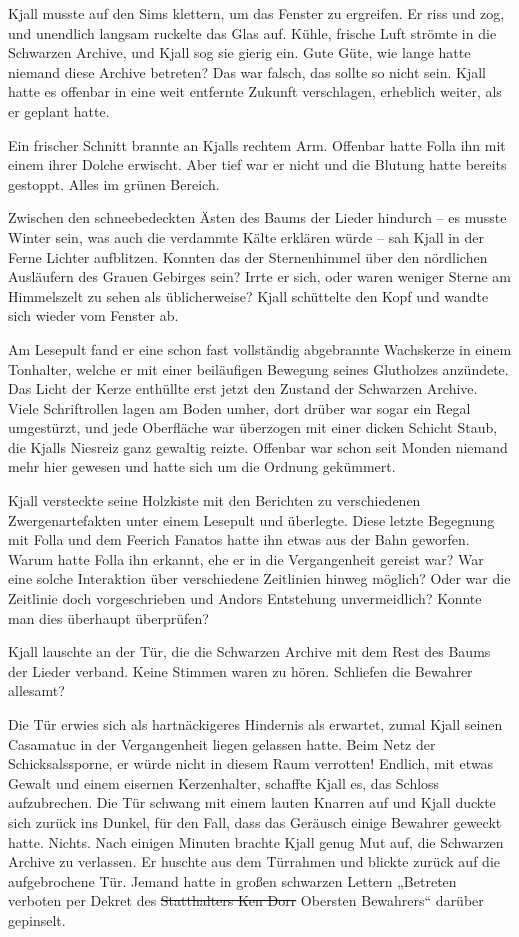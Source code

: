 Kjall musste auf den Sims klettern, um das Fenster zu ergreifen. Er riss und zog, und unendlich langsam ruckelte das Glas auf. Kühle, frische Luft strömte in die Schwarzen Archive, und Kjall sog sie gierig ein. Gute Güte, wie lange hatte niemand diese Archive betreten? Das war falsch, das sollte so nicht sein. Kjall hatte es offenbar in eine weit entfernte Zukunft verschlagen, erheblich weiter, als er geplant hatte.

Ein frischer Schnitt brannte an Kjalls rechtem Arm. Offenbar hatte Folla ihn mit einem ihrer Dolche erwischt. Aber tief war er nicht und die Blutung hatte bereits gestoppt. Alles im grünen Bereich.

Zwischen den schneebedeckten Ästen des Baums der Lieder hindurch – es musste Winter sein, was auch die verdammte Kälte erklären würde – sah Kjall in der Ferne Lichter aufblitzen. Konnten das der Sternenhimmel über den nördlichen Ausläufern des Grauen Gebirges sein? Irrte er sich, oder waren weniger Sterne am Himmelszelt zu sehen als üblicherweise? Kjall schüttelte den Kopf und wandte sich wieder vom Fenster ab.

Am Lesepult fand er eine schon fast vollständig abgebrannte Wachskerze in einem Tonhalter, welche er mit einer beiläufigen Bewegung seines Glutholzes anzündete. Das Licht der Kerze enthüllte erst jetzt den Zustand der Schwarzen Archive. Viele Schriftrollen lagen am Boden umher, dort drüber war sogar ein Regal umgestürzt, und jede Oberfläche war überzogen mit einer dicken Schicht Staub, die Kjalls Niesreiz ganz gewaltig reizte. Offenbar war schon seit Monden niemand mehr hier gewesen und hatte sich um die Ordnung gekümmert.

Kjall versteckte seine Holzkiste mit den Berichten zu verschiedenen Zwergenartefakten unter einem Lesepult und überlegte. Diese letzte Begegnung mit Folla und dem Feerich Fanatos hatte ihn etwas aus der Bahn geworfen. Warum hatte Folla ihn erkannt, ehe er in die Vergangenheit gereist war? War eine solche Interaktion über verschiedene Zeitlinien hinweg möglich? Oder war die Zeitlinie doch vorgeschrieben und Andors Entstehung unvermeidlich? Konnte man dies überhaupt überprüfen?

Kjall lauschte an der Tür, die die Schwarzen Archive mit dem Rest des Baums der Lieder verband. Keine Stimmen waren zu hören. Schliefen die Bewahrer allesamt?

Die Tür erwies sich als hartnäckigeres Hindernis als erwartet, zumal Kjall seinen Casamatuc in der Vergangenheit liegen gelassen hatte. Beim Netz der Schicksalssporne, er würde nicht in diesem Raum verrotten! Endlich, mit etwas Gewalt und einem eisernen Kerzenhalter, schaffte Kjall es, das Schloss aufzubrechen. Die Tür schwang mit einem lauten Knarren auf und Kjall duckte sich zurück ins Dunkel, für den Fall, dass das Geräusch einige Bewahrer geweckt hatte. Nichts. Nach einigen Minuten brachte Kjall genug Mut auf, die Schwarzen Archive zu verlassen. Er huschte aus dem Türrahmen und blickte zurück auf die aufgebrochene Tür. Jemand hatte in großen schwarzen Lettern „Betreten verboten per Dekret des \st{Statthalters Ken Dorr} Obersten Bewahrers“ darüber gepinselt.

